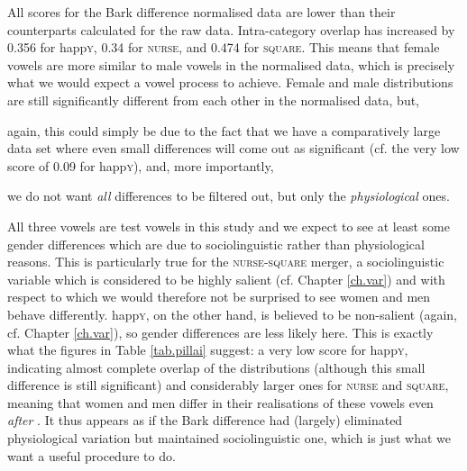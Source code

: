 All  scores for the Bark difference normalised data are lower than their counterparts calculated for the raw data.
Intra-category overlap has increased by 0.356 for happ\textsc{y}, 0.34 for \textsc{nurse}, and 0.474 for \textsc{square}.
This means that female vowels are more similar to male vowels in the normalised data, which is precisely what we would expect a vowel  process to achieve.
Female and male distributions are still significantly different from each other in the normalised data, but,
\begin{inparaenum}[(a)]
	\item again, this could simply be due to the fact that we have a comparatively large data set where even small differences will come out as significant (cf. the very low  score of 0.09 for happ\textsc{y}), and, more importantly,
	\item we do not want \emph{all} differences to be filtered out, but only the \emph{physiological} ones.
\end{inparaenum}

All three vowels are test vowels in this study and we expect to see at least some gender differences which are due to sociolinguistic rather than physiological reasons.
This is particularly true for the \textsc{nurse-square} merger, a sociolinguistic variable which is considered to be highly salient (cf. Chapter \ref{ch.var}) and with respect to which we would therefore not be surprised to see women and men behave differently.
happ\textsc{y}, on the other hand, is believed to be non-salient (again, cf. Chapter \ref{ch.var}), so gender differences are less likely here.
This is exactly what the figures in Table \ref{tab.pillai} suggest: a very low  score for happ\textsc{y}, indicating almost complete overlap of the distributions (although this small difference is still significant) and considerably larger ones for \textsc{nurse} and \textsc{square}, meaning that women and men differ in their realisations of these vowels even \emph{after} .
It thus appears as if the Bark difference  had (largely) eliminated physiological variation but maintained sociolinguistic one, which is just what we want a useful  procedure to do.

